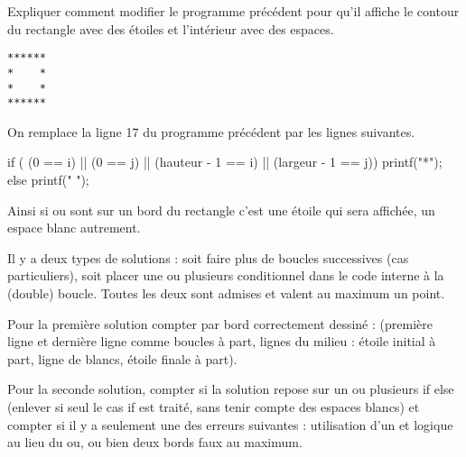 \question Expliquer comment modifier le programme précédent pour qu'il
affiche le contour du rectangle avec des étoiles et l'intérieur avec
des espaces.
\begin{verbatim}
******
*    *
*    *
******
\end{verbatim}

\begin{correction}
On remplace la ligne 17 du programme précédent par les lignes suivantes.
  \begin{listing}{17}
	    if ( (0 == i) 
		 || (0 == j)
		 || (hauteur - 1 == i)
		 || (largeur - 1 == j))
	    {
		printf("*");
	    }
	    else
	    {
		printf(" ");
	    }    
  \end{listing}
Ainsi si  ou  sont sur un bord du rectangle c'est une étoile
qui sera affichée, un espace blanc autrement.
\begin{baremeenv}
  Il y a deux types de solutions : soit faire plus de boucles
  successives (cas particuliers), soit placer une ou plusieurs
  conditionnel dans le code interne à la (double) boucle. Toutes les
  deux sont admises et valent au maximum un point.

  Pour la première solution compter  par bord correctement
  dessiné : (première ligne et dernière ligne comme boucles à part,
  lignes du milieu : étoile initial à part, ligne de blancs, étoile
  finale à part). 

  Pour la seconde solution, compter  si la solution repose sur
  un ou plusieurs if else (enlever  si seul le cas if est
  traité, sans tenir compte des espaces blancs) et compter  si il y a seulement une des erreurs suivantes : utilisation
  d'un et logique au lieu du ou, ou bien deux bords faux au maximum.
\end{baremeenv}
\end{correction}

